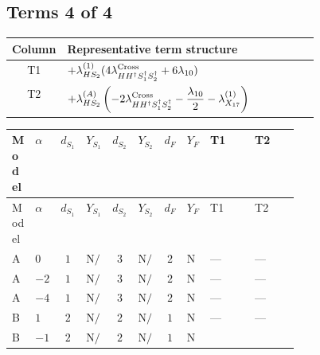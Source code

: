\documentclass[8pt]{article}
\begin{document}
\begin{landscape}
\subsection*{Terms 4 of 4}
\begin{center}
\begin{tabular}{@{}c >{\raggedright\arraybackslash}p{0.82\linewidth}@{}}
\toprule
Column & Representative term structure \\
\midrule
T1 & \(\displaystyle +{\lambda_{HS_2}^{(1)}} (4 {\lambda_{H H^\dagger S_1^\dagger S_2^\dagger}^{\rm Cross}}+6 {\lambda_{10}})\) \\
\midrule
T2 & \(\displaystyle +{\lambda_{HS_2}^{(A)}} \left(-2 {\lambda_{H H^\dagger S_1^\dagger S_2^\dagger}^{\rm Cross}}-\frac{{\lambda_{10}}}{2}-{\lambda_{X_{17}}^{(1)}}\right)\) \\
\midrule
\bottomrule
\end{tabular}
\end{center}
\smallskip
\tiny
\begin{longtable}{@{}llcccccc >{\raggedright\arraybackslash}p{0.21\linewidth} >{\raggedright\arraybackslash}p{0.21\linewidth}@{}}
\toprule
Model & $\alpha$ & $d_{S_1}$ & $Y_{S_1}$ & $d_{S_2}$ & $Y_{S_2}$ & $d_F$ & $Y_F$ & T1 & T2 \\
\midrule
\endfirsthead
\toprule
Model & $\alpha$ & $d_{S_1}$ & $Y_{S_1}$ & $d_{S_2}$ & $Y_{S_2}$ & $d_F$ & $Y_F$ & T1 & T2 \\
\midrule
\endhead
A & $0$ & $1$ & $\text{N/A}$ & $3$ & $\text{N/A}$ & $2$ & $\text{N/A}$ & --- & --- \\
\midrule
A & $-2$ & $1$ & $\text{N/A}$ & $3$ & $\text{N/A}$ & $2$ & $\text{N/A}$ & --- & --- \\
\midrule
A & $-4$ & $1$ & $\text{N/A}$ & $3$ & $\text{N/A}$ & $2$ & $\text{N/A}$ & --- & --- \\
\midrule
B & $1$ & $2$ & $\text{N/A}$ & $2$ & $\text{N/A}$ & $1$ & $\text{N/A}$ & --- & --- \\
\midrule
B & $-1$ & $2$ & $\text{N/A}$ & $2$ & $\text{N/A}$ & $1$ & $\text{N/A}$ & \scriptsize\adjustbox{max width=\linewidth}{$\begin{gathered} +{\lambda_{HS_2}^{(1)}} (4 {\lambda_{H H^\dagger S_1^\dagger S_2^\dagger}^{\rm Cross}}+6 {\lambda_{10}})\end{gathered}$} & \scriptsize\adjustbox{max width=\linewidth}{$\begin{gathered} +{\lambda_{HS_2}^{(A)}} \left(-2 {\lambda_{H H^\dagger S_1^\dagger S_2^\dagger}^{\rm Cross}}-\frac{{\lambda_{10}}}{2}-{\lambda_{X_{17}}^{(1)}}\right)\end{gathered}$} \\

\end{longtable}
\end{landscape}
\end{document}
